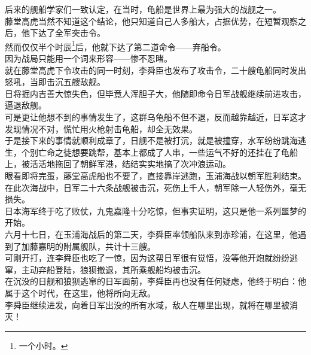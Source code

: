 \begin{multicols}{\theparacolNo}
后来的舰船学家们一致认定，在当时，龟船是世界上最为强大的战舰之一。\\

藤堂高虎当然不知道这个结论，他只知道自己人多船大，占据优势，在短暂观察之后，他下达了全军突击令。\\

然而仅仅半个时辰\footnote{一个小时。}后，他就下达了第二道命令——弃船令。\\

因为战局只能用一个词来形容——惨不忍睹。\\

就在藤堂高虎下令攻击的同一时刻，李舜臣也发布了攻击令，二十艘龟船同时发出怒吼，当即击沉五艘敌舰。\\

日将掘内吉善大惊失色，但毕竟人浑胆子大，他随即命令日军战舰继续前进攻击，逼退敌舰。\\

可是更让他想不到的事情发生了，这群乌龟船不但不退，反而越靠越近，日军这才发现情况不对，慌忙用火枪射击龟船，却全无效果。\\

于是接下来的事情就顺利成章了，日舰不是被打沉，就是被撞穿，水军纷纷跳海逃生，个别亡命之徒想要跳帮，基本上都成了人串，一些运气不好的还挂在了龟船上，被活活地拖回了朝鲜军港，结结实实地搞了次冲浪运动。\\

眼看即将完蛋，藤堂高虎船也不要了，直接靠岸逃跑，玉浦海战以朝军胜利结束。\\

在此次海战中，日军二十六条战舰被击沉，死伤上千人，朝军除一人轻伤外，毫无损失。\\

日本海军终于吃了败仗，九鬼嘉隆十分吃惊，但事实证明，这只是他一系列噩梦的开始。\\

六月十七日，在玉浦海战后的第二天，李舜臣率领船队来到赤珍浦，在这里，他遇到了加藤嘉明的附属舰队，共计十三艘。\\

可刚开打，连李舜臣也吃了一惊，因为这帮日军很有觉悟，没等他开炮就纷纷逃窜，主动弃船登陆，狼狈撤退，其所乘舰船均被击沉。\\

在沉没的日舰和狼狈逃窜的日军面前，李舜臣再也没有任何疑虑，他终于明白：他属于这个时代，在这里，他将所向无敌。\\

李舜臣继续进发，向着日军出没的所有水域，敌人在哪里出现，就将在哪里被消灭！\\


\end{multicols}
